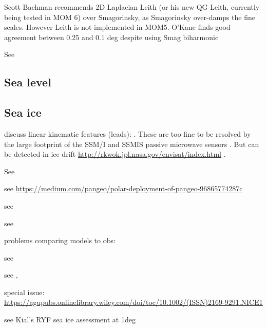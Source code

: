 \documentclass[11pt, a4paper]{article}
\begin{document}
Scott Bachman recommends 2D Laplacian Leith (or his new QG Leith, currently being tested in MOM 6) over Smagorinsky, as Smagorinsky over-damps the fine scales. 
However Leith is not implemented in MOM5.
O'Kane finds good agreement between 0.25 and 0.1 deg despite using Smag biharmonic

See \cite{Errico1985a, DurranWeynMenchaca2017a}

\subsection{Sea level}

\citet{GriffiesYinDurackGoddardBatesBehrensBentsenBiBiastoch2014a}

\subsection{Sea ice}

discuss linear kinematic features (leads): \citet{HutchingsHeilHibler2005a, WangDanilovJungKaleschkeWernecke2016a, WangWang2009a, LoschFuchsLemieuxVanselow2014a, HutterLoschMenemenlis2018a}. 
These are too fine to be resolved by the large footprint of the SSM/I and SSMIS passive microwave sensors \citep{LemieuxETAL2015a}.
But can be detected in ice drift \url{http://rkwok.jpl.nasa.gov/envisat/index.html} \citep{HutterLoschMenemenlis2018a}.

See \citet{UotilaOFarrellMarslandBi2013a}

see \url{https://medium.com/pangeo/polar-deployment-of-pangeo-96865774287c}

see \citet{SchroeterHobbsBindoffMassomMatear2018a, BarthelemyGoosseFichefetLecomte2017a, UotilaIovinoVancoppenolleLensuRousset2017a, SchweigerLindsayZhangSteeleSternKwok2011a}

see \citet{VaughanComisoAllisonCarrascoKaserKwokMoteMurrayPaul2013a, FlatoMarotzkeAbiodunBraconnotChouCollinsCoxDriouechEmori2013a,DornRinkeKoberleDethloffGerdes2018a}

problems comparing models to obs: \citet{NotzHaumannHaakJungclausMarotzke2013a}

see \citet{Naughten2018a, NaughtenETAL2018a}

see \citet{NAS2017a}, \citet{HobbsMassomStammerjohnReidWilliamsMeier2016a, UotilaETAL2018a}

special issue: \url{https://agupubs.onlinelibrary.wiley.com/doi/toc/10.1002/(ISSN)2169-9291.NICE1}

see Kial's RYF sea ice assessment at 1deg
\end{document}
